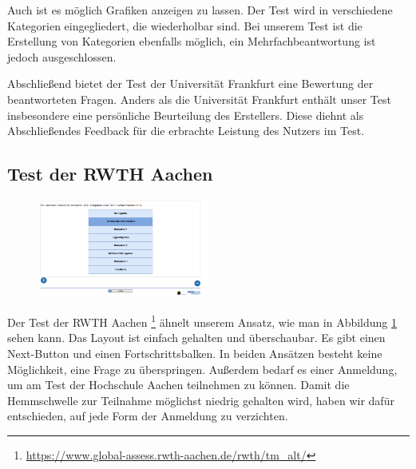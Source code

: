 Auch ist es möglich Grafiken anzeigen zu lassen.
Der Test wird in verschiedene Kategorien eingegliedert, die wiederholbar sind. 
Bei unserem Test ist die Erstellung von Kategorien ebenfalls möglich, ein Mehrfachbeantwortung ist jedoch ausgeschlossen.

Abschließend bietet der Test der Universität Frankfurt eine Bewertung der beantworteten Fragen.
Anders als die Universität Frankfurt enthält unser Test insbesondere eine persönliche Beurteilung des Erstellers.
Diese diehnt als Abschließendes Feedback für die erbrachte Leistung des Nutzers im Test.

\subsection{Test der RWTH Aachen}
\begin{figure}[htbp] 
  \centering
     \includegraphics[width=0.5\textwidth]{Jonas_Images/Abschnitte.png}
  \caption{}
  \label{fig:Bild4}
\end{figure}
Der Test der RWTH Aachen \footnote{\url{https://www.global-assess.rwth-aachen.de/rwth/tm_alt/}} ähnelt unserem Ansatz, wie man in Abbildung \ref{fig:Bild4} sehen kann.
Das Layout ist einfach gehalten und überschaubar. 
Es gibt einen Next-Button und einen Fortschrittsbalken.
In beiden Ansätzen besteht keine Möglichkeit, eine Frage zu überspringen.
Außerdem bedarf es einer Anmeldung, um am Test der Hochschule Aachen teilnehmen zu können.
Damit die Hemmschwelle zur Teilnahme möglichst niedrig gehalten wird, haben wir dafür entschieden, auf jede Form der Anmeldung zu verzichten.



